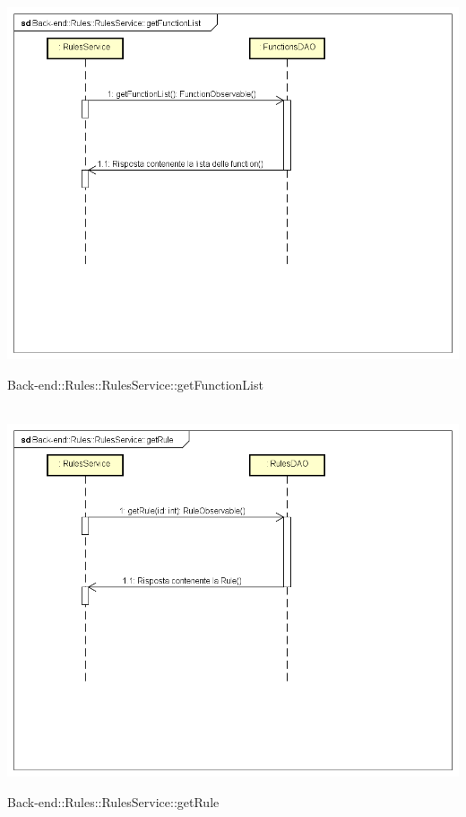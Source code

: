 \\ \includegraphics[width=\textwidth,height=\textheight,keepaspectratio]{images/diagrams/back-end/Ufficial_Backend/Back-end__Rules__RulesService__getFunctionList.png} 	\caption{Back-end::Rules::RulesService::getFunctionList}
\\ \includegraphics[width=\textwidth,height=\textheight,keepaspectratio]{images/diagrams/back-end/Ufficial_Backend/Back-end__Rules__RulesService__getRule.png} 	\caption{Back-end::Rules::RulesService::getRule}
